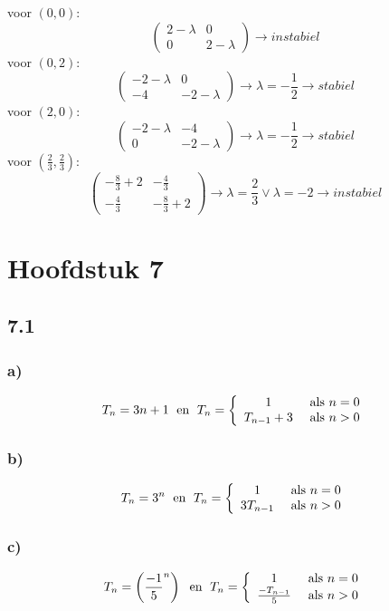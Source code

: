 \documentclass[11pt]{article}
\begin{document}
voor $(0,0)$:
\[
\begin{pmatrix}
2-\lambda & 0 \\
0 & 2-\lambda
\end{pmatrix}
\longrightarrow
instabiel
\]
voor $(0,2)$:
\[
\begin{pmatrix}
-2-\lambda & 0 \\
-4 & -2-\lambda
\end{pmatrix}
\longrightarrow
\lambda = -\frac{1}{2}
\longrightarrow
stabiel
\]
voor $(2,0)$:
\[
\begin{pmatrix}
-2-\lambda & -4 \\
0 & -2-\lambda
\end{pmatrix}
\longrightarrow
\lambda = -\frac{1}{2}
\longrightarrow
stabiel
\]
voor $(\frac{2}{3},\frac{2}{3})$:
\[
\begin{pmatrix}
-\frac{8	}{3}+2 & -\frac{4}{3}\\
-\frac{4}{3} & -\frac{8}{3}+2
\end{pmatrix}
\longrightarrow
\lambda = \frac{2}{3} \vee \lambda=-2
\longrightarrow
instabiel
\]

\section*{Hoofdstuk 7}
\subsection*{7.1}
\subsubsection*{a)}
\[
T_n = 3n+1\;\text{ en }\;T_n=\left\lbrace \begin{array}{c c}
1 &\text{ als }n=0\\
T_{n-1}+3 &\text{ als }n>0
\end{array}\right.
\]

\subsubsection*{b)}
\[
T_n = 3^n\;\text{ en }\;T_n=\left\lbrace \begin{array}{c c}
1 &\text{ als }n=0\\
3T_{n-1} &\text{ als }n>0
\end{array}\right.
\]

\subsubsection*{c)}
\[
T_n = \left( \frac{-1}{5}^n \right)\;\text{ en }\;T_n=\left\lbrace \begin{array}{c c}
1 &\text{ als }n=0\\
\frac{-T_{n-1}}{5} &\text{ als }n>0
\end{array}\right.
\]
\end{document}
